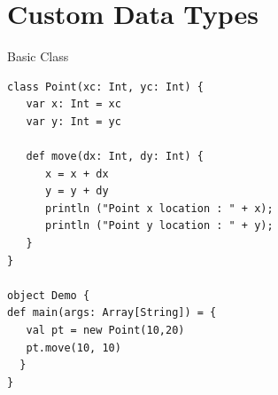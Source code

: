 \documentclass[presentation, aspectratio=169]{beamer}
\begin{document}
\section{Custom Data Types}
\label{sec:org3856197}

\begin{frame}[label={sec:org44f897e},fragile]{Basic Class}
 \tiny
\begin{verbatim}
class Point(xc: Int, yc: Int) {
   var x: Int = xc
   var y: Int = yc

   def move(dx: Int, dy: Int) {
      x = x + dx
      y = y + dy
      println ("Point x location : " + x);
      println ("Point y location : " + y);
   }
}

object Demo {
def main(args: Array[String]) = {
   val pt = new Point(10,20)
   pt.move(10, 10)
  }
}
\end{verbatim}
\end{frame}
\end{document}
